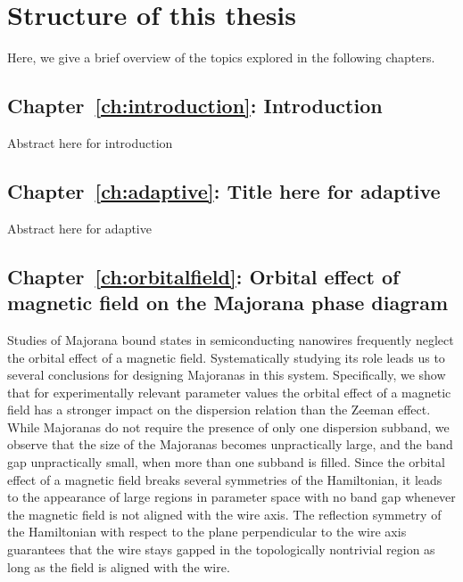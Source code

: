 \section{Structure of this thesis}

Here, we give a brief overview of the topics explored in the following chapters.
\vspace{1mm}

\subsection{Chapter~\ref{ch:introduction}: Introduction}
Abstract here for introduction
\vspace{1mm}

\subsection{Chapter~\ref{ch:adaptive}: Title here for adaptive}
Abstract here for adaptive
\vspace{1mm}

\subsection{Chapter~\ref{ch:orbitalfield}: Orbital effect of magnetic field on the Majorana phase diagram}
Studies of Majorana bound states in semiconducting nanowires frequently neglect the orbital effect of a magnetic field.
Systematically studying its role leads us to several conclusions for designing Majoranas in this system.
Specifically, we show that for experimentally relevant parameter values the orbital effect of a magnetic field has a stronger impact on the dispersion relation than the Zeeman effect.
While Majoranas do not require the presence of only one dispersion subband, we observe that the size of the Majoranas becomes unpractically large, and the band gap unpractically small, when more than one subband is filled.
Since the orbital effect of a magnetic field breaks several symmetries of the Hamiltonian, it leads to the appearance of large regions in parameter space with no band gap whenever the magnetic field is not aligned with the wire axis.
The reflection symmetry of the Hamiltonian with respect to the plane perpendicular to the wire axis guarantees that the wire stays gapped in the topologically nontrivial region as long as the field is aligned with the wire.
\vspace{1mm}

